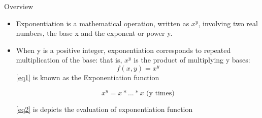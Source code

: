 \documentclass[final]{beamer}
\newlength{\onecolwid}
\begin{document}
\begin{frame}
\begin{columns}[t]
\begin{column}{\onecolwid}
\begin{exampleblock}{Overview}

\begin{itemize}
\item Exponentiation\cite{wiki} is a mathematical operation, written as $x^y$, involving two real numbers, the base x and the exponent or power y.  
\item When y is a positive integer, exponentiation corresponds to repeated multiplication of the base:  that is, $x^y$ is the product of multiplying y bases: 
\begin{equation} \label{eq1}
f(x,y)= x^y
\end{equation}
\ref{eq1} is known as the Exponentiation function

\begin{equation} \label{eq2}
x^y= x*...*x \textrm{ (y times)}
\end{equation}
 
\ref{eq2} is depicts the evaluation of exponentiation function

\end{itemize}

\end{exampleblock}





\end{column}
\end{columns}
\end{frame}
\end{document}
